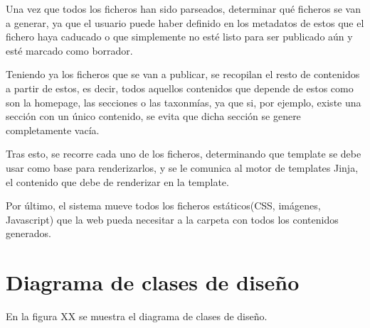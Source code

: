 Una vez que todos los ficheros han sido parseados, determinar qué ficheros se van a generar, ya que
el usuario puede haber definido en los metadatos de estos que el fichero haya caducado o que simplemente
no esté listo para ser publicado aún y esté marcado como borrador.

Teniendo ya los ficheros que se van a publicar, se recopilan el resto de contenidos a partir de estos, es decir,
todos aquellos contenidos que depende de estos como son la homepage, las secciones o las taxonmías, 
ya que si, por ejemplo, existe una sección con un único contenido, se evita que dicha sección se genere 
completamente vacía.

Tras esto, se recorre cada uno de los ficheros, determinando que template se debe usar como base para renderizarlos, 
y se le comunica al motor de templates Jinja, el contenido que debe de renderizar en la template.

Por último, el sistema mueve todos los ficheros estáticos(CSS, imágenes, Javascript) que la web pueda necesitar 
a la carpeta con todos los contenidos generados.



\section{Diagrama de clases de diseño}

En la figura XX se muestra el diagrama de clases de diseño.


